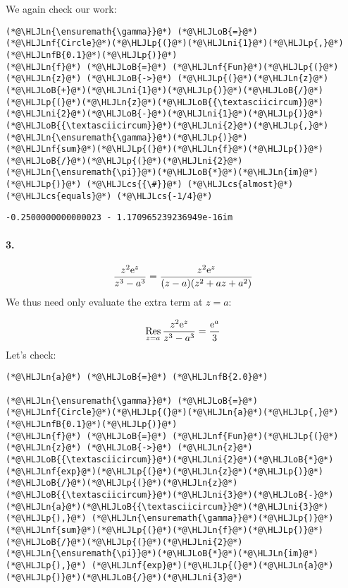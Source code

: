 \documentclass[12pt,landscape]{article}
\newcommand{\HLJLn}[1]{#1}
\newcommand{\HLJLnf}[1]{\textcolor[RGB]{66,102,213}{#1}}
\newcommand{\HLJLnfB}[1]{\textcolor[RGB]{59,151,46}{#1}}
\newcommand{\HLJLni}[1]{\textcolor[RGB]{59,151,46}{#1}}
\newcommand{\HLJLoB}[1]{\textcolor[RGB]{102,102,102}{\textbf{#1}}}
\newcommand{\HLJLp}[1]{#1}
\newcommand{\HLJLcs}[1]{\textcolor[RGB]{153,153,119}{\textit{#1}}}
\def\E{ {\rm e} }
\def\Res_#1{\underset{#1}{\rm Res}\,}
\begin{document}
{We again check our work:


\begin{lstlisting}
(*@\HLJLn{\ensuremath{\gamma}}@*) (*@\HLJLoB{=}@*) (*@\HLJLnf{Circle}@*)(*@\HLJLp{(}@*)(*@\HLJLni{1}@*)(*@\HLJLp{,}@*) (*@\HLJLnfB{0.1}@*)(*@\HLJLp{)}@*)
(*@\HLJLn{f}@*) (*@\HLJLoB{=}@*) (*@\HLJLnf{Fun}@*)(*@\HLJLp{(}@*)(*@\HLJLn{z}@*) (*@\HLJLoB{->}@*) (*@\HLJLp{(}@*)(*@\HLJLn{z}@*)(*@\HLJLoB{+}@*)(*@\HLJLni{1}@*)(*@\HLJLp{)}@*)(*@\HLJLoB{/}@*)(*@\HLJLp{(}@*)(*@\HLJLn{z}@*)(*@\HLJLoB{{\textasciicircum}}@*)(*@\HLJLni{2}@*)(*@\HLJLoB{-}@*)(*@\HLJLni{1}@*)(*@\HLJLp{)}@*)(*@\HLJLoB{{\textasciicircum}}@*)(*@\HLJLni{2}@*)(*@\HLJLp{,}@*) (*@\HLJLn{\ensuremath{\gamma}}@*)(*@\HLJLp{)}@*)
(*@\HLJLnf{sum}@*)(*@\HLJLp{(}@*)(*@\HLJLn{f}@*)(*@\HLJLp{)}@*)(*@\HLJLoB{/}@*)(*@\HLJLp{(}@*)(*@\HLJLni{2}@*)(*@\HLJLn{\ensuremath{\pi}}@*)(*@\HLJLoB{*}@*)(*@\HLJLn{im}@*)(*@\HLJLp{)}@*) (*@\HLJLcs{{\#}}@*) (*@\HLJLcs{almost}@*) (*@\HLJLcs{equals}@*) (*@\HLJLcs{-1/4}@*)
\end{lstlisting}

\begin{lstlisting}
-0.2500000000000023 - 1.170965239236949e-16im
\end{lstlisting}

\newpage
\paragraph{3.}
\[
{z^2 \E^z \over z^3 - a^3} = {z^2 \E^z \over (z-a) (z^2 + az + a^2)}
\]
We thus need only evaluate the extra term at $z=a$:

\[
\Res_{z = a} {z^2 \E^z \over z^3 - a^3} = {\E^a \over 3}
\]
Let's check:


\begin{lstlisting}
(*@\HLJLn{a}@*) (*@\HLJLoB{=}@*) (*@\HLJLnfB{2.0}@*)

(*@\HLJLn{\ensuremath{\gamma}}@*) (*@\HLJLoB{=}@*) (*@\HLJLnf{Circle}@*)(*@\HLJLp{(}@*)(*@\HLJLn{a}@*)(*@\HLJLp{,}@*) (*@\HLJLnfB{0.1}@*)(*@\HLJLp{)}@*)
(*@\HLJLn{f}@*) (*@\HLJLoB{=}@*) (*@\HLJLnf{Fun}@*)(*@\HLJLp{(}@*)(*@\HLJLn{z}@*) (*@\HLJLoB{->}@*) (*@\HLJLn{z}@*)(*@\HLJLoB{{\textasciicircum}}@*)(*@\HLJLni{2}@*)(*@\HLJLoB{*}@*)(*@\HLJLnf{exp}@*)(*@\HLJLp{(}@*)(*@\HLJLn{z}@*)(*@\HLJLp{)}@*)(*@\HLJLoB{/}@*)(*@\HLJLp{(}@*)(*@\HLJLn{z}@*)(*@\HLJLoB{{\textasciicircum}}@*)(*@\HLJLni{3}@*)(*@\HLJLoB{-}@*)(*@\HLJLn{a}@*)(*@\HLJLoB{{\textasciicircum}}@*)(*@\HLJLni{3}@*)(*@\HLJLp{),}@*) (*@\HLJLn{\ensuremath{\gamma}}@*)(*@\HLJLp{)}@*)
(*@\HLJLnf{sum}@*)(*@\HLJLp{(}@*)(*@\HLJLn{f}@*)(*@\HLJLp{)}@*)(*@\HLJLoB{/}@*)(*@\HLJLp{(}@*)(*@\HLJLni{2}@*)(*@\HLJLn{\ensuremath{\pi}}@*)(*@\HLJLoB{*}@*)(*@\HLJLn{im}@*)(*@\HLJLp{),}@*) (*@\HLJLnf{exp}@*)(*@\HLJLp{(}@*)(*@\HLJLn{a}@*)(*@\HLJLp{)}@*)(*@\HLJLoB{/}@*)(*@\HLJLni{3}@*)
\end{lstlisting}

}
\end{document}
